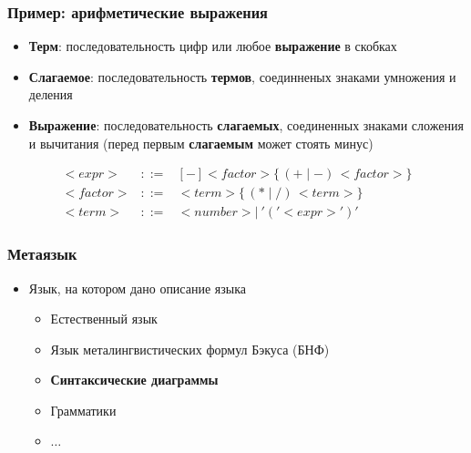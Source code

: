 \documentclass{beamer}
\begin{document}
\begin{frame}[fragile]
  \transwipe[direction=90]
  \frametitle{Пример: арифметические выражения}

  \begin{itemize}
    \item \textbf{Терм}: последовательность цифр или любое \textbf{выражение} в скобках
    \item \textbf{Слагаемое}: последовательность \textbf{термов}, соединненых знаками умножения и деления
    \item \textbf{Выражение}: последовательность \textbf{слагаемых}, соединенных знаками сложения и вычитания (перед первым \textbf{слагаемым} может стоять минус)
  \end{itemize}

\[
\begin{array}{rcl}
<expr>& ::= & [-] <factor> \{ \, ( + \mid - ) \, <factor> \} \\
<factor>& ::= & <term> \{ \, (* \mid /) \, <term> \} \\
<term>& ::= & <number> \mid \ '(' <expr> ')'
\end{array}
\]

\end{frame}

\begin{frame}[fragile]
  \transwipe[direction=90]
  \frametitle{Метаязык}
  \begin{itemize}
    \item Язык, на котором дано описание языка
    \begin{itemize}
      \item Естественный язык
      \item Язык металингвистических формул Бэкуса (БНФ)
      \item \textbf{Синтаксические диаграммы}
      \item Грамматики
      \item $\dots$
    \end{itemize}
  \end{itemize}
\end{frame}
\end{document}
